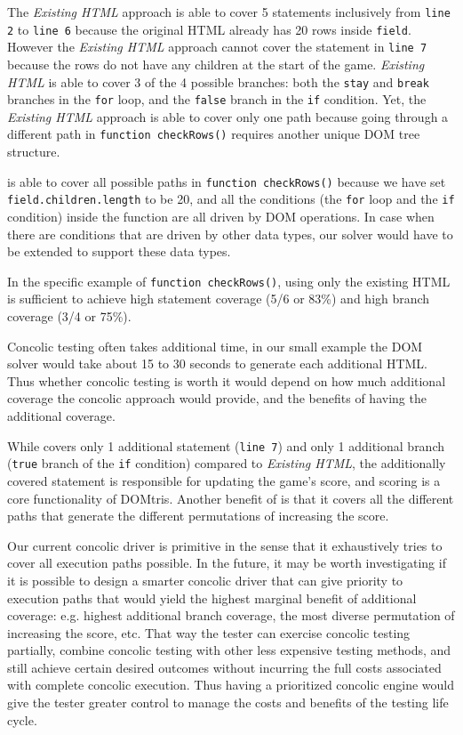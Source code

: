 The {\em Existing HTML} approach is able to cover 5 statements inclusively from {\tt line 2} to {\tt line 6} because the original HTML already has 20 rows inside {\tt field}.  
However the {\em Existing HTML} approach cannot cover the statement in {\tt line 7} because the rows do not have any children at the start of the game. 
{\em Existing HTML} is able to cover 3 of the 4 possible branches: both the {\tt stay} and {\tt break} branches in the {\tt for} loop, and the {\tt false} branch in the {\tt if} condition. 
Yet, the {\em Existing HTML} approach is able to cover only one path because going through a different path in {\tt function checkRows()} requires another unique DOM tree structure.  

\tool is able to cover all possible paths in {\tt function checkRows()} because we have set {\tt field.children.length} to be 20, 
and all the conditions (the {\tt for} loop and the {\tt if} condition) inside the function are all driven by DOM operations.  
In case when there are conditions that are driven by other data types, our solver would have to be extended to support these data types.    

In the specific example of {\tt function checkRows()}, using only the existing HTML is sufficient to achieve high statement coverage (5/6 or 83\%) and high branch coverage (3/4 or 75\%).  

Concolic testing often takes additional time, in our small example the DOM solver would take about 15 to 30 seconds to generate each additional HTML.
Thus whether concolic testing is worth it would depend on how much additional coverage the concolic approach would provide, and the benefits of having the additional coverage.  

While \tool covers only 1 additional statement ({\tt line 7}) and only 1 additional branch ({\tt true} branch of the {\tt if} condition) compared to {\em Existing HTML}, 
the additionally covered statement is responsible for updating the game's score, and scoring is a core functionality of DOMtris.  
Another benefit of \tool is that it covers all the different paths that generate the different permutations of increasing the score.  

Our current concolic driver is primitive in the sense that it exhaustively tries to cover all execution paths possible.  
In the future, it may be worth investigating if it is possible to design a smarter concolic driver that can give priority to execution paths that would yield the highest marginal benefit of additional coverage: 
e.g. highest additional branch coverage, the most diverse permutation of increasing the score, etc.  
That way the tester can exercise concolic testing partially, combine concolic testing with other less expensive testing methods, and still achieve certain desired outcomes without incurring the full costs associated with complete concolic execution.  
Thus having a prioritized concolic engine would give the tester greater control to manage the costs and benefits of the testing life cycle.  


